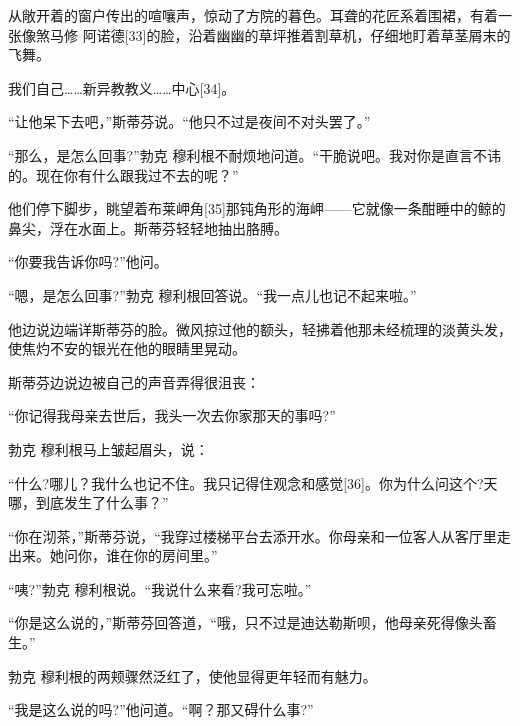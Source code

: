 \documentclass{article}
\begin{document}
从敞开着的窗户传出的喧嚷声，惊动了方院的暮色。耳聋的花匠系着围裙，有着一张像煞马修 \cdot 阿诺德[33]的脸，沿着幽幽的草坪推着割草机，仔细地盯着草茎屑末的飞舞。



我们自己……新异教教义……中心[34]。



“让他呆下去吧，”斯蒂芬说。“他只不过是夜间不对头罢了。”



“那么，是怎么回事?”勃克 \cdot 穆利根不耐烦地问道。“干脆说吧。我对你是直言不讳的。现在你有什么跟我过不去的呢？”



他们停下脚步，眺望着布莱岬角[35]那钝角形的海岬——它就像一条酣睡中的鲸的鼻尖，浮在水面上。斯蒂芬轻轻地抽出胳膊。



“你要我告诉你吗?”他问。



“嗯，是怎么回事?”勃克 \cdot 穆利根回答说。“我一点儿也记不起来啦。”



他边说边端详斯蒂芬的脸。微风掠过他的额头，轻拂着他那未经梳理的淡黄头发，使焦灼不安的银光在他的眼睛里晃动。



斯蒂芬边说边被自己的声音弄得很沮丧：



“你记得我母亲去世后，我头一次去你家那天的事吗?”



勃克 \cdot 穆利根马上皱起眉头，说：



“什么?哪儿？我什么也记不住。我只记得住观念和感觉[36]。你为什么问这个?天哪，到底发生了什么事？”



“你在沏茶，”斯蒂芬说，“我穿过楼梯平台去添开水。你母亲和一位客人从客厅里走出来。她问你，谁在你的房间里。”



“咦?”勃克 \cdot 穆利根说。“我说什么来看?我可忘啦。”



“你是这么说的，”斯蒂芬回答道，“哦，只不过是迪达勒斯呗，他母亲死得像头畜生。”



勃克 \cdot 穆利根的两颊骤然泛红了，使他显得更年轻而有魅力。



“我是这么说的吗?”他问道。“啊？那又碍什么事?”
\end{document}
